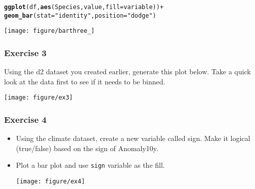 \documentclass{beamer}\usepackage[]{graphicx}\usepackage[]{color}
\makeatletter
\newcommand{\hlstr}[1]{\textcolor[rgb]{0.192,0.494,0.8}{#1}}%
\newcommand{\hlkwd}[1]{\textcolor[rgb]{0.737,0.353,0.396}{\textbf{#1}}}%
\newenvironment{kframe}{%
 \def\at@end@of@kframe{}%
 \ifinner\ifhmode%
  \def\at@end@of@kframe{\end{minipage}}%
  \begin{minipage}{\columnwidth}%
 \fi\fi%
 \def\FrameCommand##1{\hskip\@totalleftmargin \hskip-\fboxsep
 \colorbox{shadecolor}{##1}\hskip-\fboxsep
     \hskip-\linewidth \hskip-\@totalleftmargin \hskip\columnwidth}%
 \MakeFramed {\advance\hsize-\width
   \@totalleftmargin\z@ \linewidth\hsize
   \@setminipage}}%
 {\par\unskip\endMakeFramed%
 \at@end@of@kframe}
\newenvironment{knitrout}{}{} %
\makeatother
\begin{document}
\begin{frame}[fragile]
\begin{knitrout}\footnotesize
{}\color{fgcolor}\begin{kframe}
\begin{alltt}
\hlkwd{ggplot}(df, \hlkwd{aes}(Species, value, fill = variable)) +
\hlkwd{geom_bar}(stat = \hlstr{"identity"}, position = \hlstr{"dodge"})
\end{alltt}
\end{kframe}

{\centering \texttt{[image: figure/barthree\_]} 

}



\end{knitrout}

\end{frame}

\begin{frame}[fragile]
\frametitle{Exercise 3}
Using the d2 dataset you created earlier, generate this plot below. Take a quick look at the data first to see if it needs to be binned.
\begin{knitrout}\footnotesize
{}\color{fgcolor}

{\centering \texttt{[image: figure/ex3]} 

}



\end{knitrout}

\end{frame}

\begin{frame}[fragile]
\frametitle{Exercise 4}
\begin{itemize}
\item Using the climate dataset, create a new variable called sign. Make it logical (true/false) based on the sign of Anomaly10y.
\item Plot a bar plot and use \texttt{sign} variable as the fill.\\
\begin{knitrout}\footnotesize
{}\color{fgcolor}

{\centering \texttt{[image: figure/ex4]} 

}



\end{knitrout}


\end{itemize}
\end{frame}
\end{document}
